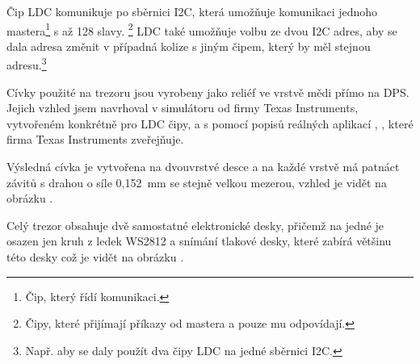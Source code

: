 Čip LDC komunikuje po sběrnici I2C, která umožňuje komunikaci jednoho mastera\footnote{Čip, který řídí komunikaci.} s až 128 slavy.
\footnote{Čipy, které přijímají příkazy od mastera a pouze mu odpovídají.} LDC také umožňuje volbu ze dvou I2C adres, aby se dala adresa změnit v případná 
kolize s jiným čipem, který by měl stejnou adresu.\footnote{Např. aby se daly použít dva čipy LDC na jedné sběrnici I2C.}

\newpage

Cívky použité na trezoru jsou vyrobeny jako reliéf ve vrstvě mědi přímo na DPS. Jejich vzhled jsem navrhoval v simulátoru od firmy Texas Instruments, 
vytvořeném konkrétně pro LDC čipy, a s pomocí popisů reálných aplikací \parencite{LDC-cd0}, \parencite{LDC-cd1}, které firma Texas Instruments zveřejňuje.


Výsledná cívka je vytvořena na dvouvrstvé desce a na každé vrstvě má patnáct závitů s drahou o síle 0,152~mm se stejně velkou mezerou, 
vzhled je vidět na obrázku .

Celý trezor obsahuje dvě samostatné elektronické desky, přičemž na jedné je osazen jen kruh z ledek WS2812 a snímání tlakové desky, které zabírá 
většinu této desky což je vidět na obrázku .

\newpage
